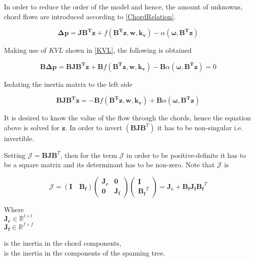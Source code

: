 In order to reduce the order of the model and hence, the amount of unknowns, chord flows are introduced according to \eqref{ChordRelation}. 

\begin{equation}
    \bm{\Delta p} =  \bm{J} \bm{B^T} \bm{\dot{z}} + f(\bm{B^T}\bm{z}, \bm{w}, \bm{k_v}) - \alpha (\bm{\omega},\bm{B^T}\bm{z})
  \label{ChordsModel}
\end{equation}

Making use of $KVL$ shown in \eqref{KVL}, the following is obtained

\begin{equation}
 \bm{B}\bm{\Delta p} = \bm{B} \bm{J} \bm{B^T} \bm{\dot{z}} + \bm{B} f(\bm{B^T}\bm{z}, \bm{w}, \bm{k_v}) - \bm{B}\alpha (\bm{\omega},\bm{B^T}\bm{z}) = 0
 \end{equation}

Isolating the inertia matrix to the left side

\begin{equation}
  \bm{B} \bm{J} \bm{B^T} \bm{\dot{z}} = - \bm{B} f(\bm{B^T}\bm{z}, \bm{w}, \bm{k_v}) + \bm{B}\alpha (\bm{\omega},\bm{B^T}\bm{z}) 
 \label{isolateZ}
 \end{equation}

It is desired to know the value of the flow through the chords, hence the equation above is solved 
for $\bm{\dot{z}}$. In order to invert $(\bm{B J} \bm{{B}}^T)$ it has to be non-singular i.e. invertible. 

Setting $\bm{\mathcal{J}} = \bm{B J} \bm{{B}}^T $, then for the term $\bm{\mathcal{J}}$ in order to be positive-definite it has to be a square matrix and its determinant has to be non-zero. Note that $\bm{\mathcal{J}}$ is

\begin{equation}
  \label{Jequation}
  \bm{\mathcal{J}} = (\bm{I \quad B_f}) 
  \begin{pmatrix}
    \bm{J_c}    &    \bm{0 }   \\
    \bm{0}       &   \bm{ J_f}
  \end{pmatrix}
  \begin{pmatrix}
    \bm{I}    \\
    \bm{{B_f}}^T
  \end{pmatrix}
  = \bm{J_c} + \bm{B_f J_f} \bm{{B_f}}^T
\end{equation}

\begin{minipage}[t]{0.20\textwidth}
Where\\
\hspace*{8mm} $\bm{J_c} \in \mathbb{R}^{l \times l}$  \\
\hspace*{8mm} $\bm{J_f} \in \mathbb{R}^{f \times f} $ 
\end{minipage}
\begin{minipage}[t]{0.68\textwidth}
\vspace*{2mm}
\hspace*{4mm} is the inertia in the chord components,\\
\hspace*{4mm} is the inertia in the components of the spanning tree.
\end{minipage}

